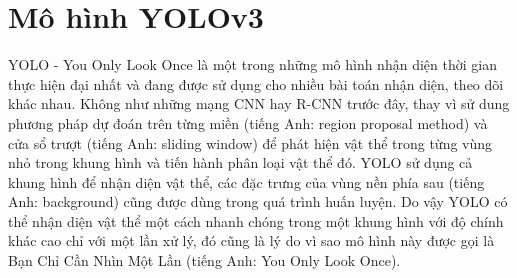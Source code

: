 \section{Mô hình YOLOv3}
YOLO - You Only Look Once là một trong những mô hình nhận diện thời gian thực hiện đại nhất và đang được sử dụng cho nhiều bài toán nhận diện, theo dõi khác nhau. Không như những mạng CNN hay R-CNN  trước đây, thay vì sử dung phương pháp dự đoán trên từng miền (tiếng Anh: region proposal method) và cửa sổ trượt (tiếng Anh: sliding window) để phát hiện vật thể trong từng vùng nhỏ trong khung hình và tiến hành phân loại vật thể đó. YOLO sử dụng cả khung hình để nhận diện vật thể, các đặc trưng của vùng nền phía sau (tiếng Anh: background) cũng được dùng trong quá trình huấn luyện. Do vậy YOLO có thể nhận diện vật thể một cách nhanh chóng trong một khung hình với độ chính khác cao chỉ với một lần xử lý, đó cũng là lý do vì sao mô hình này được gọi là Bạn Chỉ Cần Nhìn Một Lần (tiếng Anh: You Only Look Once).
